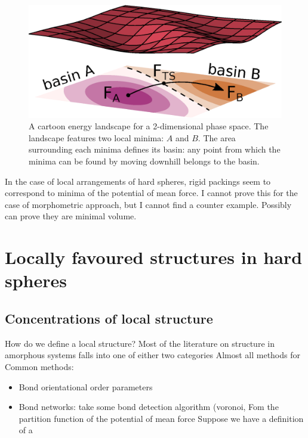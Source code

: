 \documentclass[12pt]{report}
\begin{document}
\begin{figure}
  \includegraphics[width=\linewidth]{toy-landscape}
  \caption{A cartoon energy landscape for a 2-dimensional phase space.
    The landscape features two local minima: $A$ and $B$.
    The area surrounding each minima defines its basin: any point from which the minima can be found by moving downhill belongs to the basin.}
\end{figure}

In the case of local arrangements of hard spheres, rigid packings seem to correspond to minima of the potential of mean force.
I cannot prove this for the case of morphometric approach, but I cannot find a counter example.
Possibly can prove they are minimal volume.

\section{Locally favoured structures in hard spheres}

\subsection{Concentrations of local structure}

How do we define a local structure?
Most of the literature on structure in amorphous systems falls into one of either two categories
Almost all methods for Common methods:
\begin{itemize}
  \item Bond orientational order parameters
  \item Bond networks: take some bond detection algorithm (voronoi, 
Fom the partition function of the potential of mean force
Suppose we have a definition of a
\end{itemize}
\end{document}
